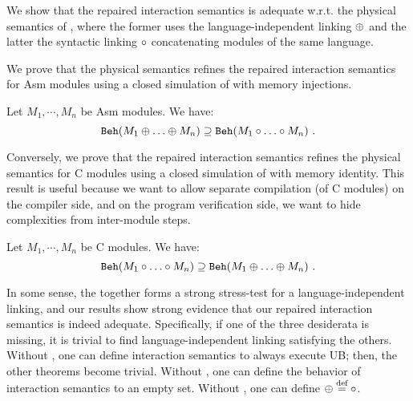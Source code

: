 

We show that the repaired interaction semantics is adequate w.r.t. the physical semantics of \cc{},
where the former uses the language-independent linking $\oplus$ and the latter the syntactic linking $\circ$
concatenating modules of the same language.

We prove that the physical semantics refines the repaired interaction semantics for \textrm{Asm} modules
using a closed simulation of \cc{} with memory injections.
\begin{theorem}\label{thm:results-adequacy-asm}
  Let $M_1, \cdots, M_n$ be \textrm{Asm} modules.  We have:
  \[   \mathtt{Beh}({M_1 \oplus \ldots \oplus M_n}) \supseteq  \mathtt{Beh}({M_1 \circ \ldots \circ M_n}) ~.\]
\end{theorem}
\noindent
{}



Conversely, we prove that the repaired interaction semantics refines the physical semantics for \textrm{\cc{} C} modules
using a closed simulation of \cc{} with memory identity.
This result is useful because we want to allow separate compilation (of C modules) on the compiler side, and on the program verification side, we want to hide complexities from inter-module steps.
\begin{theorem}[Adequacy w.r.t C]\label{thm:results-adequacy-c}
  Let $M_1, \cdots, M_n$ be \textrm{\cc{} C} modules.  We have:
  \[  \mathtt{Beh}({M_1 \circ \ldots \circ M_n}) \supseteq \mathtt{Beh}({M_1 \oplus \ldots \oplus M_n})  ~.\]
\end{theorem}


In some sense, the  together forms a strong stress-test for a language-independent linking, and our results show strong evidence that our repaired interaction semantics is indeed adequate.
Specifically, if one of the three desiderata is missing, it is trivial to find language-independent linking satisfying the others.
Without , one can define interaction semantics to always execute UB; then, the other theorems become trivial.
Without , one can define the behavior of interaction semantics to an empty set.
Without , one can define $\oplus \stackrel{\text{def}}{=} \circ$.

